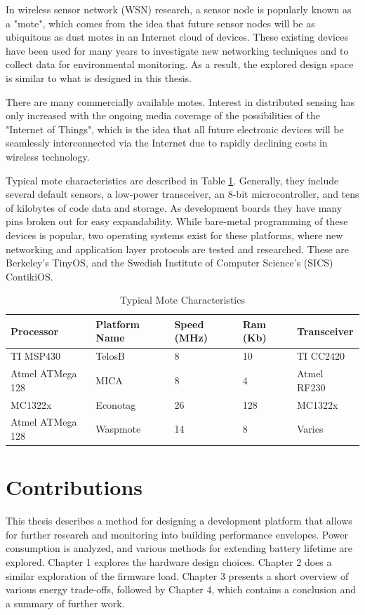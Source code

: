 In wireless sensor network (WSN) research, a sensor node is popularly known as a "mote", which comes from the idea that future sensor nodes will be as ubiquitous as dust motes in an Internet cloud of devices. These existing devices have been used for many years to investigate new networking techniques and to collect data for environmental monitoring. As a result, the explored design space is similar to what is designed in this thesis. 

There are many commercially available motes. Interest in distributed sensing has only increased with the ongoing media coverage of the possibilities of the "Internet of Things", which is the idea that all future electronic devices will be seamlessly interconnected via the Internet due to rapidly declining costs in wireless technology. 

Typical mote characteristics are described in Table \ref{mote_characteristics}. Generally, they include several default sensors, a low-power transceiver, an 8-bit microcontroller, and tens of kilobytes of code data and storage. As development boards they have many pins broken out for easy expandability. While bare-metal programming of these devices is popular, two operating systems exist for these platforms, where new networking and application layer protocols are tested and researched. These are Berkeley's TinyOS, and the Swedish Institute of Computer Science's (SICS) ContikiOS.

\begin{table}[h]
\begin{tabular}{@{}lllll@{}}
\toprule
Processor & Platform Name & Speed (MHz) & Ram (Kb) & Transceiver \\ \midrule
TI MSP430 & TelosB & 8 & 10 & TI CC2420 \\
Atmel ATMega 128 & MICA & 8 & 4 & Atmel RF230 \\
MC1322x & Econotag & 26 & 128 & MC1322x \\
Atmel ATMega 128 & Waspmote & 14 & 8 & Varies \\ \bottomrule
\end{tabular}
\caption{Typical Mote Characteristics}
\label{mote_characteristics}
\end{table}

\section{Contributions}

This thesis describes a method for designing a development platform that allows for further research and monitoring into building performance envelopes. Power consumption is analyzed, and various methods for extending battery lifetime are explored. Chapter 1 explores the hardware design choices. Chapter 2 does a similar exploration of the firmware load. Chapter 3 presents a short overview of various energy trade-offs, followed by Chapter 4, which contains a conclusion and a summary of further work.